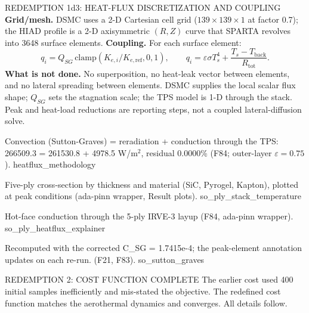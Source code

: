 \documentclass[aspectratio=169,11pt]{beamer}
\begin{document}
\begin{frame}{REDEMPTION 1d3: HEAT-FLUX DISCRETIZATION AND COUPLING}
  \small
  \textbf{Grid/mesh.} DSMC uses a 2-D Cartesian cell grid
  ($139\times139\times1$ at factor 0.7); the HIAD profile is a 2-D
  axisymmetric $(R,Z)$ curve that SPARTA revolves into 3648 surface elements.
  \textbf{Coupling.} For each surface element:
  \[
    q_i=Q_{SG}\,\mathrm{clamp}(K_{e,i}/K_{e,\mathrm{ref}},0,1),
    \qquad
    q_i=\varepsilon\sigma T_s^4+\frac{T_s-T_{\mathrm{back}}}{R_{\mathrm{tot}}}.
  \]
  \textbf{What is not done.} No superposition, no heat-leak vector between
  elements, and no lateral spreading between elements. DSMC supplies the local
  scalar flux shape; $Q_{SG}$ sets the stagnation scale; the TPS model is 1-D
  through the stack. Peak and heat-load reductions are reporting steps, not a
  coupled lateral-diffusion solve.
\end{frame}

  {%
   Convection (Sutton-Graves) = reradiation + conduction through the TPS:
   266509.3 = 261530.8 + 4978.5 W/m$^2$, residual 0.0000\% (F84; outer-layer $\varepsilon=0.75$).}
  {heatflux_methodology}

  {Five-ply cross-section by thickness and material (SiC, Pyrogel, Kapton),
   plotted at peak conditions (ada-pinn wrapper, Result plots).}
  {so_ply_stack_temperature}

  {Hot-face conduction through the 5-ply IRVE-3 layup (F84, ada-pinn wrapper).}
  {so_ply_heatflux_explainer}

  {Recomputed with the corrected C\_SG = 1.7415e-4; the peak-element
   annotation updates on each re-run. (F21, F83).}
  {so_sutton_graves}



\begin{frame}{REDEMPTION 2: COST FUNCTION COMPLETE}
  The earlier cost used 400 initial samples inefficiently and mis-stated
  the objective. The redefined cost function matches the aerothermal
  dynamics and converges. All details follow.
\end{frame}
\end{document}
